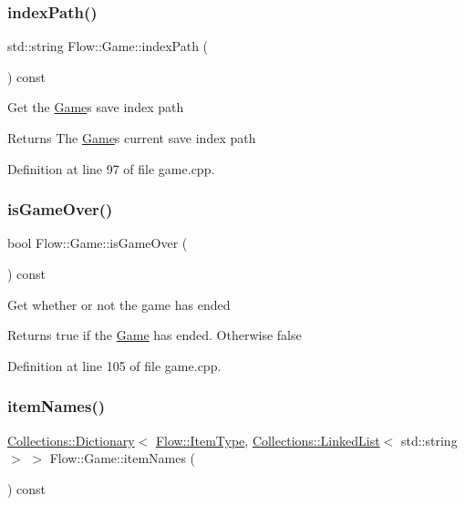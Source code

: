 \hypertarget{class_flow_1_1_game_a200c86e4c7a3f63b8dd27819eed1b13c}{}\label{class_flow_1_1_game_a200c86e4c7a3f63b8dd27819eed1b13c} 
\subsubsection{\texorpdfstring{index\+Path()}{indexPath()}}
{\footnotesize\ttfamily std\+::string Flow\+::\+Game\+::index\+Path (\begin{DoxyParamCaption}{ }\end{DoxyParamCaption}) const}

Get the \hyperlink{class_flow_1_1_game}{Game}\textquotesingle{}s save index path \begin{DoxyReturn}{Returns}
The \hyperlink{class_flow_1_1_game}{Game}\textquotesingle{}s current save index path 
\end{DoxyReturn}


Definition at line 97 of file game.\+cpp.

\hypertarget{class_flow_1_1_game_a66ce2ce0a7e590682aa064b240cc4024}{}\label{class_flow_1_1_game_a66ce2ce0a7e590682aa064b240cc4024} 
\subsubsection{\texorpdfstring{is\+Game\+Over()}{isGameOver()}}
{\footnotesize\ttfamily bool Flow\+::\+Game\+::is\+Game\+Over (\begin{DoxyParamCaption}{ }\end{DoxyParamCaption}) const}

Get whether or not the game has ended \begin{DoxyReturn}{Returns}
true if the \hyperlink{class_flow_1_1_game}{Game} has ended. Otherwise false 
\end{DoxyReturn}


Definition at line 105 of file game.\+cpp.

\hypertarget{class_flow_1_1_game_a21ce5c0b4e1b53fa661e85af8b0342de}{}\label{class_flow_1_1_game_a21ce5c0b4e1b53fa661e85af8b0342de} 
\subsubsection{\texorpdfstring{item\+Names()}{itemNames()}}
{\footnotesize\ttfamily \hyperlink{class_collections_1_1_dictionary}{Collections\+::\+Dictionary}$<$ \hyperlink{namespace_flow_a09368c0b65b3d1bc5c227ed1046c8bca}{Flow\+::\+Item\+Type}, \hyperlink{class_collections_1_1_linked_list}{Collections\+::\+Linked\+List}$<$ std\+::string $>$ $>$ Flow\+::\+Game\+::item\+Names (\begin{DoxyParamCaption}{ }\end{DoxyParamCaption}) const}

